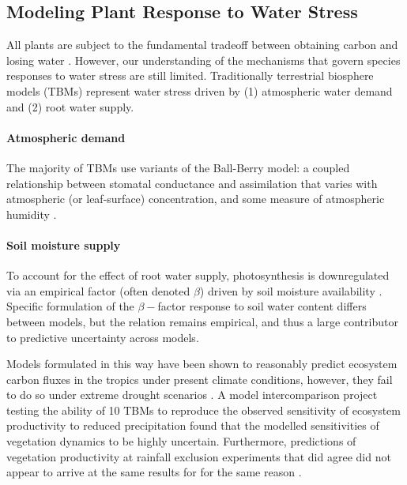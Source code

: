 \subsection*{Modeling Plant Response to Water Stress}

All plants are subject to the fundamental tradeoff between obtaining carbon and losing water \citep{bonan_2014}.  However, our understanding of the mechanisms that govern species responses to water stress are still limited. Traditionally terrestrial biosphere models (TBMs) represent water stress driven by (1) atmospheric water demand and (2) root water supply.

\paragraph{Atmospheric demand}

The majority of TBMs use variants of the Ball-Berry model: a coupled relationship between stomatal conductance and  assimilation that varies with atmospheric (or leaf-surface)  concentration, and some measure of atmospheric humidity \citep{farquhar_1984, ball_1987, leuning_1995, medlyn_2011}.

\paragraph{Soil moisture supply}

To account for the effect of root water supply, photosynthesis is downregulated via an empirical factor (often denoted $\beta$) driven by soil moisture availability \citep{rogers_2017}. Specific formulation of the $\beta-$factor response to soil water content differs between models, but the relation remains empirical, and thus a large contributor to predictive uncertainty across models. 
 
Models formulated in this way have been shown to reasonably predict ecosystem carbon fluxes in the tropics under present climate conditions, however, they fail to do  so under extreme drought scenarios \citep{powell_2013, zhang_2015}. A model intercomparison project testing the ability of 10 TBMs to reproduce the observed sensitivity of ecosystem productivity to reduced precipitation found that the modelled sensitivities of vegetation dynamics to be highly uncertain. Furthermore, predictions of vegetation productivity at rainfall exclusion experiments that did agree did not appear to arrive at the same results for for the same reason \citep{paschalis_2020}.

